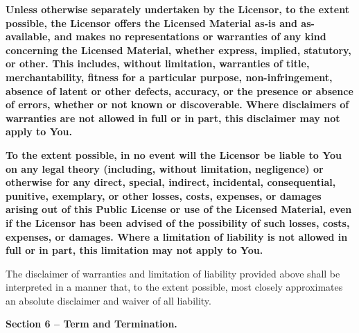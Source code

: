 \begin{doclicense@enumerate}
\item \textbf{Unless otherwise separately undertaken by the Licensor, to the extent possible, the Licensor offers the Licensed Material as-is and as-available, and makes no representations or warranties of any kind concerning the Licensed Material, whether express, implied, statutory, or other. This includes, without limitation, warranties of title, merchantability, fitness for a particular purpose, non-infringement, absence of latent or other defects, accuracy, or the presence or absence of errors, whether or not known or discoverable. Where disclaimers of warranties are not allowed in full or in part, this disclaimer may not apply to You.}
\item \textbf{To the extent possible, in no event will the Licensor be liable to You on any legal theory (including, without limitation, negligence) or otherwise for any direct, special, indirect, incidental, consequential, punitive, exemplary, or other losses, costs, expenses, or damages arising out of this Public License or use of the Licensed Material, even if the Licensor has been advised of the possibility of such losses, costs, expenses, or damages. Where a limitation of liability is not allowed in full or in part, this limitation may not apply to You.}
\end{doclicense@enumerate}
\begin{doclicense@enumerate}
\item The disclaimer of warranties and limitation of liability provided above shall be interpreted in a manner that, to the extent possible, most closely approximates an absolute disclaimer and waiver of all liability.
\end{doclicense@enumerate}
\par \textbf{Section 6 – Term and Termination.}
